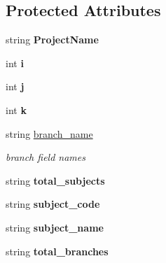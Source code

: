 \subsection*{Protected Attributes}
\begin{DoxyCompactItemize}
\item 
\hypertarget{classHTMLTags_a9ed88cd64186174fe5453bc59b3fbe46}{string {\bfseries Project\-Name}}\label{classHTMLTags_a9ed88cd64186174fe5453bc59b3fbe46}

\item 
\hypertarget{classHTMLTags_a571b1d2b580555251d0f131086a57677}{int {\bfseries i}}\label{classHTMLTags_a571b1d2b580555251d0f131086a57677}

\item 
\hypertarget{classHTMLTags_a9af17bf120e2c2e3dc8ec7c2ecfb8d90}{int {\bfseries j}}\label{classHTMLTags_a9af17bf120e2c2e3dc8ec7c2ecfb8d90}

\item 
\hypertarget{classHTMLTags_a23b5212cbe6e637c5a15b2ddf0144884}{int {\bfseries k}}\label{classHTMLTags_a23b5212cbe6e637c5a15b2ddf0144884}

\item 
\hypertarget{classHTMLTags_a9906347d29a4256a824e4fb0ecd89f62}{string \hyperlink{classHTMLTags_a9906347d29a4256a824e4fb0ecd89f62}{branch\-\_\-name}}\label{classHTMLTags_a9906347d29a4256a824e4fb0ecd89f62}

\begin{DoxyCompactList}\small\item\em branch field names \end{DoxyCompactList}\item 
\hypertarget{classHTMLTags_a150314c7c15f317e6600129991d342bb}{string {\bfseries total\-\_\-subjects}}\label{classHTMLTags_a150314c7c15f317e6600129991d342bb}

\item 
\hypertarget{classHTMLTags_acda47c333a94c60172aec7023715e562}{string {\bfseries subject\-\_\-code}}\label{classHTMLTags_acda47c333a94c60172aec7023715e562}

\item 
\hypertarget{classHTMLTags_a2ae76cfc823201fd1043c8939f3c15ab}{string {\bfseries subject\-\_\-name}}\label{classHTMLTags_a2ae76cfc823201fd1043c8939f3c15ab}

\item 
\hypertarget{classHTMLTags_a1987b2f2a9c4bc84fbfc8b1fdf031016}{string {\bfseries total\-\_\-branches}}\label{classHTMLTags_a1987b2f2a9c4bc84fbfc8b1fdf031016}


\end{DoxyCompactItemize}
